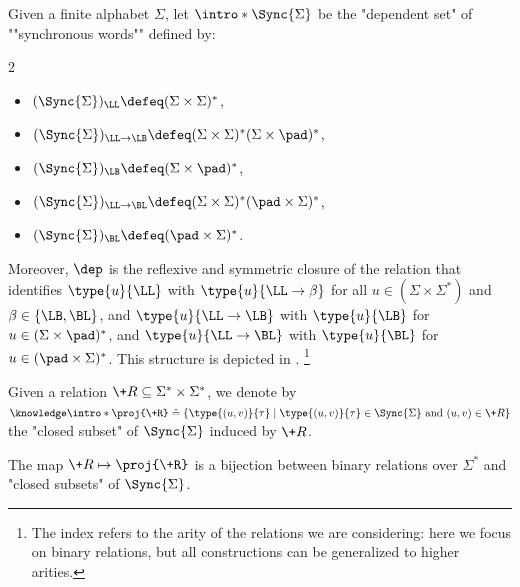 \begin{example}
	Given a finite alphabet $\Sigma$, let $\intro*\Sync{\Sigma}$ be the "dependent set" of ""synchronous words"" defined by:
	\vspace{-1.25em}
	\begin{multicols}{2}
	\begin{itemize}
		\item $(\Sync{\Sigma})_{\LL} \defeq (\Sigma\times \Sigma)^*$,
		\item $(\Sync{\Sigma})_{\LL\to\LB} \defeq (\Sigma\times \Sigma)^*(\Sigma\times \pad)^*$,
		\item $(\Sync{\Sigma})_{\LB} \defeq (\Sigma\times \pad)^*$,
		\columnbreak
		\vfill
		\item $(\Sync{\Sigma})_{\LL\to\BL} \defeq (\Sigma\times \Sigma)^*(\pad\times \Sigma)^*$,
		\item $(\Sync{\Sigma})_{\BL} \defeq (\pad\times \Sigma)^*$.
	\end{itemize}
	\end{multicols}
	\vspace{-1em}
	Moreover, $\dep$ is the reflexive and symmetric closure of the relation that
	identifies $\type{u}{\LL}$ with $\type{u}{\LL\to\beta}$ for all
	$u \in (\Sigma\times\Sigma^*)$ and $\beta \in \{\LB,\BL\}$, 
	and $\type{u}{\LL\to\LB}$ with $\type{u}{\LB}$
	for $u \in (\Sigma\times\pad)^*$,
	and $\type{u}{\LL\to\BL}$ with $\type{u}{\BL}$
	for $u \in (\pad\times\Sigma)^*$.
	This structure is depicted in .%
	\footnote{The index refers to the arity of the relations we are considering: here we focus on binary relations, but all constructions can be generalized to higher arities.}
\end{example}


Given a relation $\+R \subseteq \Sigma^* \times \Sigma^*$, we denote by
$\AP\intro*\proj{\+R} \defeq \{\type{(u,v)}{\tau} \mid \type{(u,v)}{\tau} \in \Sync{\Sigma} \text{ and } (u,v) \in \+R\}$
the "closed subset" of $\Sync{\Sigma}$ induced by $\+R$.

\begin{fact}
	The map $\+R \mapsto \proj{\+R}$ is a bijection between
	binary relations over $\Sigma^*$ and "closed subsets" of $\Sync{\Sigma}$.
\end{fact}


